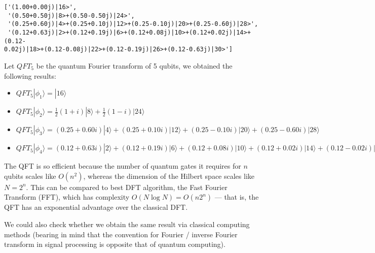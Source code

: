 \documentclass[11pt,dvipsnames]{article}
\makeatletter
\newcommand{\boxspacing}{\kern\kvtcb@left@rule\kern\kvtcb@boxsep}
\newcommand{\prompt}[4]{
        {\ttfamily\llap{{\color{#2}[#3]:\hspace{3pt}#4}}\vspace{-\baselineskip}}
    }
\makeatother
\begin{document}
            \begin{tcolorbox}[breakable, size=fbox, boxrule=.5pt, pad at break*=1mm, opacityfill=0]
\prompt{Out}{outcolor}{13}{\boxspacing}
\begin{Verbatim}[commandchars=\\\{\}]
['(1.00+0.00j)|16>',
 '(0.50+0.50j)|8>+(0.50-0.50j)|24>',
 '(0.25+0.60j)|4>+(0.25+0.10j)|12>+(0.25-0.10j)|20>+(0.25-0.60j)|28>',
 '(0.12+0.63j)|2>+(0.12+0.19j)|6>+(0.12+0.08j)|10>+(0.12+0.02j)|14>+(0.12-
0.02j)|18>+(0.12-0.08j)|22>+(0.12-0.19j)|26>+(0.12-0.63j)|30>']
\end{Verbatim}
\end{tcolorbox}
        
    Let \(QFT_5\) be the quantum Fourier transform of 5 qubits, we obtained
the following results:

\begin{itemize}
    \item \(QFT_5|\phi_1\rangle = |16⟩\) 
    \item \(QFT_5|\phi_2\rangle = \frac{1}{2}(1+i)|8⟩+\frac{1}{2}(1-i)|24⟩\) 
    \item \(QFT_5|\phi_3\rangle = (0.25+0.60i)|4⟩+(0.25+0.10 i)|12⟩+(0.25-0.10 i) |20⟩ + (0.25-0.60i)|28⟩\)
    \item \(QFT_5|\phi_4\rangle = (0.12+0.63i)|2⟩+(0.12+0.19i)|6⟩+(0.12+0.08i)|10⟩+(0.12+0.02i)|14⟩+(0.12-0.02i)|18⟩+(0.12-0.08i)|22⟩+(0.12-0.19i)|26⟩+(0.12-0.63i)|30⟩\) 
\end{itemize}

The QFT is so efficient because the number of quantum gates it requires
for \(n\) qubits scales like \(O(n^2)\), whereas the dimension of the
Hilbert space scales like \(N=2^n\). This can be compared to best DFT
algorithm, the Fast Fourier Transform (FFT), which has complexity
\(O(N\log N)=O(n2^n)\) --- that is, the QFT has an exponential advantage
over the classical DFT.

We could also check whether we obtain the same result via classical
computing methods (bearing in mind that the convention for Fourier /
inverse Fourier transform in signal processing is opposite that of
quantum computing).
\end{document}

